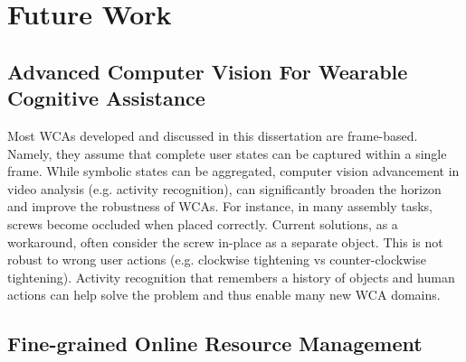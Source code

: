 


\section{Future Work}

\subsection{Advanced Computer Vision For Wearable Cognitive Assistance}

Most WCAs developed and discussed in this dissertation are frame-based. Namely,
they assume that complete user states can be captured within a single frame.
While symbolic states can be aggregated, computer vision advancement in video
analysis (e.g. activity recognition), can significantly broaden the horizon and
improve the robustness of WCAs. For instance, in many assembly tasks, screws
become occluded when placed correctly. Current solutions, as a workaround, often
consider the screw in-place as a separate object. This is not robust to wrong
user actions (e.g. clockwise tightening vs counter-clockwise tightening).
Activity recognition that remembers a history of objects and human actions can
help solve the problem and thus enable many new WCA domains.

\subsection{Fine-grained Online Resource Management}


